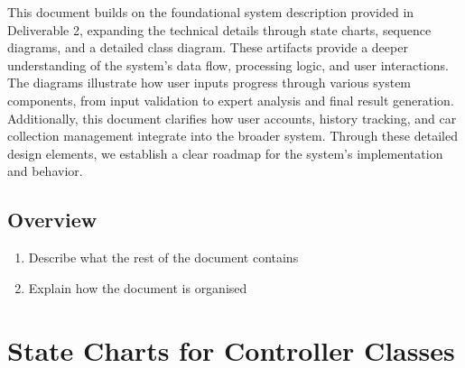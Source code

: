 \documentclass[]{article}
\begin{document}
\noindent This document builds on the foundational system description provided in Deliverable 2, expanding the technical details through state charts, sequence diagrams, and a detailed class diagram. These artifacts provide a deeper understanding of the system’s data flow, processing logic, and user interactions. The diagrams illustrate how user inputs progress through various system components, from input validation to expert analysis and final result generation. Additionally, this document clarifies how user accounts, history tracking, and car collection management integrate into the broader system. Through these detailed design elements, we establish a clear roadmap for the system’s implementation and behavior.


\subsection{Overview}
\label{sub:overview}
\begin{enumerate}[a]
	\item Describe what the rest of the document contains 
	\item Explain how the document is organised
\end{enumerate}



\section{State Charts for Controller Classes}
\label{sec:state_charts_for_controller_classes}
\end{document}
